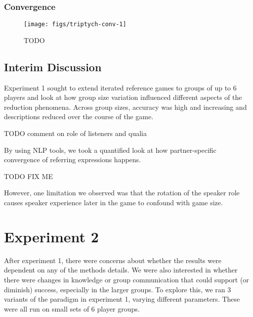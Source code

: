 \documentclass[
  english,
  a4paper,
]{article}
\begin{document}
\hypertarget{convergence}{%
\subsubsection{Convergence}\label{convergence}}

\begin{figure*}[t!]

{\centering \texttt{[image: figs/triptych-conv-1]} 

}

\caption{TODO}\label{fig:triptych-conv}
\end{figure*}

\hypertarget{interim-discussion}{%
\subsection{Interim Discussion}\label{interim-discussion}}

Experiment 1 sought to extend iterated reference games to groups of up to 6 players and look at how group size variation influenced different aspects of the reduction phenomena. Across group sizes, accuracy was high and increasing and descriptions reduced over the course of the game.

TODO comment on role of listeners and qualia

By using NLP tools, we took a quantified look at how partner-specific convergence of referring expressions happens.

TODO FIX ME

However, one limitation we observed was that the rotation of the speaker role causes speaker experience later in the game to confound with game size.

\hypertarget{experiment-2}{%
\section{Experiment 2}\label{experiment-2}}

After experiment 1, there were concerns about whether the results were dependent on any of the methods details. We were also interested in whether there were changes in knowledge or group communication that could support (or diminish) success, especially in the larger groups. To explore this, we ran 3 variants of the paradigm in experiment 1, varying different parameters. These were all run on small sets of 6 player groups.
\end{document}
